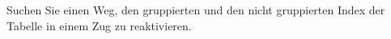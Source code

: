 \item Suchen Sie einen Weg, den gruppierten und den nicht gruppierten Index der
Tabelle  in einem Zug zu reaktivieren.
